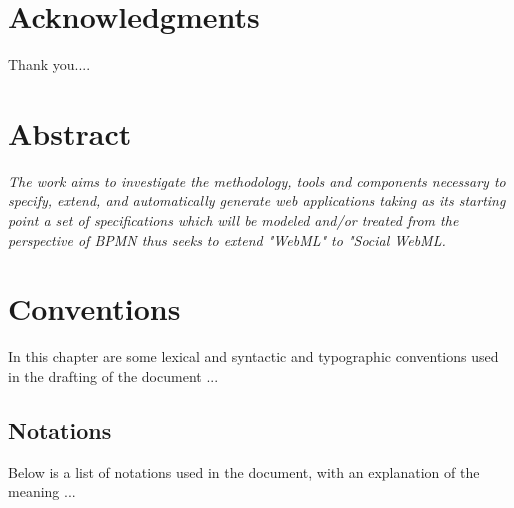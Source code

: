 \documentclass[a4paper]{memoir}
\begin{document}
\pagestyle{empty}
%

\frontmatter
\pagestyle{plain}

\begin{epigraphs}
\end{epigraphs}

\chapter*{Acknowledgments}
Thank you....


\chapter*{Abstract}
\label{chap:abstract}

\textit{The work aims to investigate the methodology, tools and components necessary to specify, extend, and automatically generate web applications taking as its starting point a set of specifications which will be modeled and/or treated from the perspective of BPMN thus seeks to extend "WebML" to "Social WebML.}



\chapter*{Conventions}
\label{chap:preface}
In this chapter are some lexical and syntactic and typographic conventions used in the drafting of the document ...

\section*{Notations}
\label{sec:notations}
Below is a list of notations used in the document, with an explanation of the meaning ...
\end{document}
